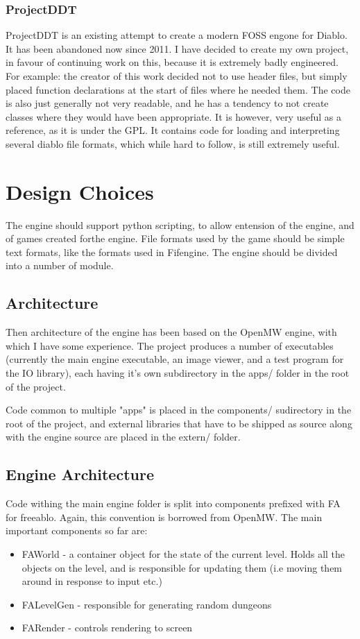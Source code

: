 \documentclass[a4paper]{article}
\begin{document}
    	\subsubsection{ProjectDDT}
    	ProjectDDT\cite{ddt} is an existing attempt to create a modern FOSS engone for Diablo.
    	It has been abandoned now since 2011.
    	I have decided to create my own project, in favour of continuing work on this, because it is extremely badly engineered.
    	For example: the creator of this work decided not to use header files, but simply placed function declarations at the start of files where he needed them.
    	The code is also just generally not very readable, and he has a tendency to not create classes where they would have been appropriate.
    	It is however, very useful as a reference, as it is under the GPL.
    	It contains code for loading and interpreting several diablo file formats, which while hard to follow, is still extremely useful.
  	\newpage
        
    \section{Design Choices}
    The engine should support python scripting, to allow entension of the engine, and of games created forthe engine.
    File formats used by the game should be simple text formats, like the formats used in Fifengine.
    The engine should be divided into a number of module.
    
    \subsection{Architecture}
    Then architecture of the engine has been based on the OpenMW\cite{openmw} engine, with which I have some experience.
    The project produces a number of executables (currently the main engine executable, an image viewer, and a test program for the IO library), each having it's own subdirectory in the apps/ folder in the root of the project.
    
    Code common to multiple "apps" is placed in the components/ sudirectory in the root of the project, and external libraries that have to be shipped as source along with the engine source are placed in the extern/ folder.
    
    \subsection{Engine Architecture}
    Code withing the main engine folder is split into components prefixed with FA for freeablo. Again, this convention is borrowed from OpenMW\cite{openmw}.
    The main important components so far are:
    \begin{itemize}
        \item{FAWorld - a container object for the state of the current level. Holds all the objects on the level, and is responsible for updating them (i.e moving them around in response to input etc.)}
        \item{FALevelGen - responsible for generating random dungeons}
        \item{FARender - controls rendering to screen}
    \end{itemize}
\end{document}
